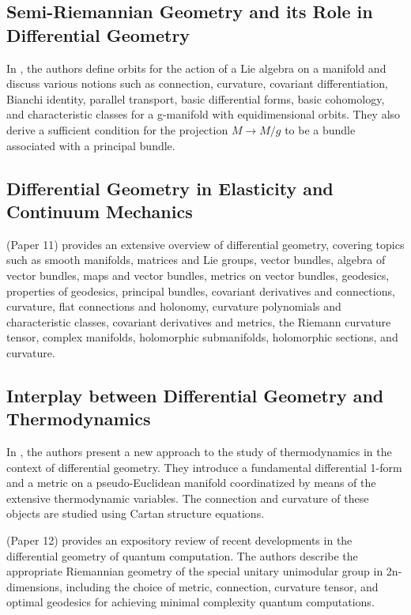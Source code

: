 \documentclass{article}
\begin{document}
\subsection{Semi-Riemannian Geometry and its Role in Differential Geometry}

In \cite{D.2003DifferentialGO}, the authors define orbits for the action of a Lie algebra on a manifold and discuss various notions such as connection, curvature, covariant differentiation, Bianchi identity, parallel transport, basic differential forms, basic cohomology, and characteristic classes for a g-manifold with equidimensional orbits. They also derive a sufficient condition for the projection $M \rightarrow M/g$ to be a bundle associated with a principal bundle.

\subsection{Differential Geometry in Elasticity and Continuum Mechanics}

(Paper 11) provides an extensive overview of differential geometry, covering topics such as smooth manifolds, matrices and Lie groups, vector bundles, algebra of vector bundles, maps and vector bundles, metrics on vector bundles, geodesics, properties of geodesics, principal bundles, covariant derivatives and connections, curvature, flat connections and holonomy, curvature polynomials and characteristic classes, covariant derivatives and metrics, the Riemann curvature tensor, complex manifolds, holomorphic submanifolds, holomorphic sections, and curvature.

\subsection{Interplay between Differential Geometry and Thermodynamics}

In \cite{Quevedo2003DifferentialGA}, the authors present a new approach to the study of thermodynamics in the context of differential geometry. They introduce a fundamental differential 1-form and a metric on a pseudo-Euclidean manifold coordinatized by means of the extensive thermodynamic variables. The connection and curvature of these objects are studied using Cartan structure equations.

(Paper 12) provides an expository review of recent developments in the differential geometry of quantum computation. The authors describe the appropriate Riemannian geometry of the special unitary unimodular group in 2n-dimensions, including the choice of metric, connection, curvature tensor, and optimal geodesics for achieving minimal complexity quantum computations.
\end{document}

